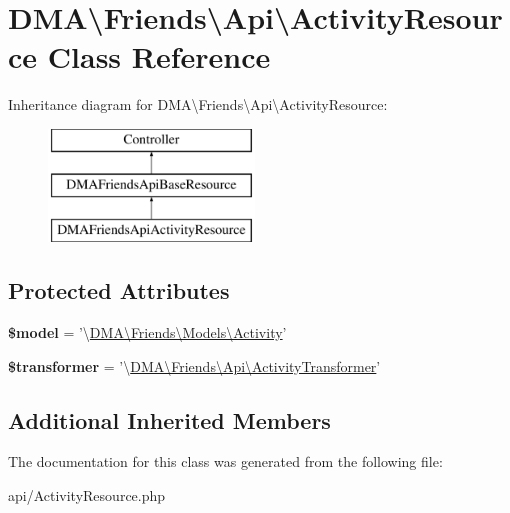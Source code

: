 \hypertarget{classDMA_1_1Friends_1_1Api_1_1ActivityResource}{\section{D\-M\-A\textbackslash{}Friends\textbackslash{}Api\textbackslash{}Activity\-Resource Class Reference}
\label{classDMA_1_1Friends_1_1Api_1_1ActivityResource}
}
Inheritance diagram for D\-M\-A\textbackslash{}Friends\textbackslash{}Api\textbackslash{}Activity\-Resource\-:\begin{figure}[H]
\begin{center}
\leavevmode
\includegraphics[height=3.000000cm]{d7/d53/classDMA_1_1Friends_1_1Api_1_1ActivityResource}
\end{center}
\end{figure}
\subsection*{Protected Attributes}
\begin{DoxyCompactItemize}
\item 
\hypertarget{classDMA_1_1Friends_1_1Api_1_1ActivityResource_a242d36374707954a784f08931e1796d9}{{\bfseries \$model} = '\textbackslash{}\hyperlink{classDMA_1_1Friends_1_1Models_1_1Activity}{D\-M\-A\textbackslash{}\-Friends\textbackslash{}\-Models\textbackslash{}\-Activity}'}\label{classDMA_1_1Friends_1_1Api_1_1ActivityResource_a242d36374707954a784f08931e1796d9}

\item 
\hypertarget{classDMA_1_1Friends_1_1Api_1_1ActivityResource_ab46a991a9e3980e6864c2c98c4fefe3a}{{\bfseries \$transformer} = '\textbackslash{}\hyperlink{classDMA_1_1Friends_1_1Api_1_1ActivityTransformer}{D\-M\-A\textbackslash{}\-Friends\textbackslash{}\-Api\textbackslash{}\-Activity\-Transformer}'}\label{classDMA_1_1Friends_1_1Api_1_1ActivityResource_ab46a991a9e3980e6864c2c98c4fefe3a}

\end{DoxyCompactItemize}
\subsection*{Additional Inherited Members}


The documentation for this class was generated from the following file\-:\begin{DoxyCompactItemize}
\item 
api/Activity\-Resource.\-php\end{DoxyCompactItemize}
